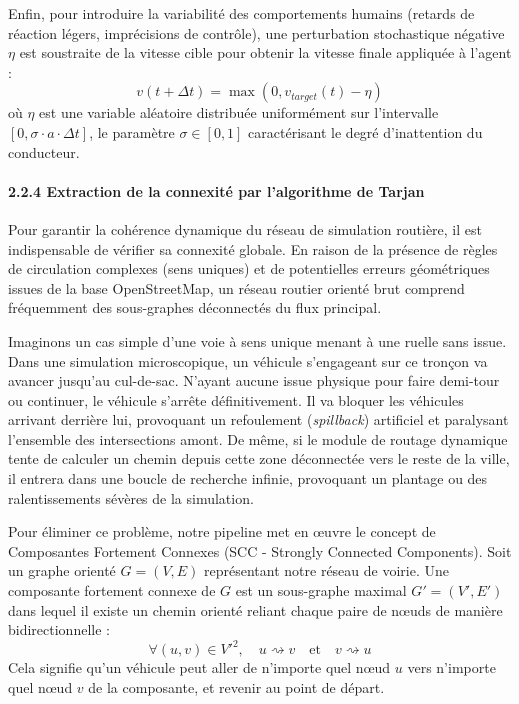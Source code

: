 \documentclass[10pt, a4paper]{article}
\begin{document}
Enfin, pour introduire la variabilité des comportements humains (retards
de réaction légers, imprécisions de contrôle), une perturbation
stochastique négative \(\eta\) est soustraite de la vitesse cible pour
obtenir la vitesse finale appliquée à l'agent :
\[v(t + \Delta t) = \max\left( 0, v_{target}(t) - \eta \right)\] où
\(\eta\) est une variable aléatoire distribuée uniformément sur
l'intervalle \([0, \sigma \cdot a \cdot \Delta t]\), le paramètre
\(\sigma \in [0, 1]\) caractérisant le degré d'inattention du
conducteur.

\paragraph{2.2.4 Extraction de la connexité par l'algorithme de
Tarjan}\label{extraction-de-la-connexituxe9-par-lalgorithme-de-tarjan}

Pour garantir la cohérence dynamique du réseau de simulation routière,
il est indispensable de vérifier sa connexité globale. En raison de la
présence de règles de circulation complexes (sens uniques) et de
potentielles erreurs géométriques issues de la base OpenStreetMap, un
réseau routier orienté brut comprend fréquemment des sous-graphes
déconnectés du flux principal.

Imaginons un cas simple d'une voie à sens unique menant à une ruelle
sans issue. Dans une simulation microscopique, un véhicule s'engageant
sur ce tronçon va avancer jusqu'au cul-de-sac. N'ayant aucune issue
physique pour faire demi-tour ou continuer, le véhicule s'arrête
définitivement. Il va bloquer les véhicules arrivant derrière lui,
provoquant un refoulement (\emph{spillback}) artificiel et paralysant
l'ensemble des intersections amont. De même, si le module de routage
dynamique tente de calculer un chemin depuis cette zone déconnectée vers
le reste de la ville, il entrera dans une boucle de recherche infinie,
provoquant un plantage ou des ralentissements sévères de la simulation.

Pour éliminer ce problème, notre pipeline met en œuvre le concept de
Composantes Fortement Connexes (SCC - Strongly Connected Components).
Soit un graphe orienté \(G = (V, E)\) représentant notre réseau de
voirie. Une composante fortement connexe de \(G\) est un sous-graphe
maximal \(G' = (V', E')\) dans lequel il existe un chemin orienté
reliant chaque paire de nœuds de manière bidirectionnelle :
\[\forall (u, v) \in V'^2, \quad u \rightsquigarrow v \quad \text{et} \quad v \rightsquigarrow u\]
Cela signifie qu'un véhicule peut aller de n'importe quel nœud \(u\)
vers n'importe quel nœud \(v\) de la composante, et revenir au point de
départ.
\end{document}
